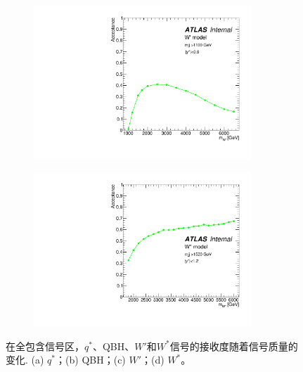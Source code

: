 \begin{figure}[htbp]
\begin{subfigure}{.5\textwidth}
   \caption{}
   \label{fig:QBH}
  \end{subfigure}
\newline
  \begin{subfigure}{.5\textwidth}
  \centering
   \includegraphics[width=0.9\textwidth]{figuresDijet/03-BenchmarkSignals/Acc_Wprime.pdf}
   \caption{}
   \label{fig:WPrime}
  \end{subfigure}
  \begin{subfigure}{.5\textwidth}
  \centering
   \includegraphics[width=0.9\textwidth]{figuresDijet/03-BenchmarkSignals/Acc_Wstar_yS1p2.pdf}
   \caption{}
   \label{fig:WStar}
  \end{subfigure}
  \caption{
在全包含信号区，$q^*$、QBH、$W'$和$W^*$信号的接收度随着信号质量的变化.
(a) $q^*$；(b) QBH；(c) $W\prime$；(d) $W^*$。
  }
  \label{fig:ACCP}
\end{figure} 

